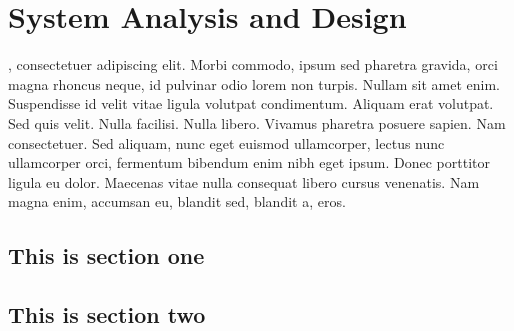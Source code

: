 \chapter{System Analysis and Design}

, consectetuer adipiscing elit. Morbi commodo, ipsum sed pharetra gravida, orci magna rhoncus neque, id pulvinar odio lorem non turpis. Nullam sit amet enim. Suspendisse id velit vitae ligula volutpat condimentum. Aliquam erat volutpat. Sed quis velit. Nulla facilisi. Nulla libero. Vivamus pharetra posuere sapien. Nam consectetuer. Sed aliquam, nunc eget euismod ullamcorper, lectus nunc ullamcorper orci, fermentum bibendum enim nibh eget ipsum. Donec porttitor ligula eu dolor. Maecenas vitae nulla consequat libero cursus venenatis. Nam magna enim, accumsan eu, blandit sed, blandit a, eros.

\blindtext

\section{This is section one}
\blindtext

\section{This is section two}
\blindtext